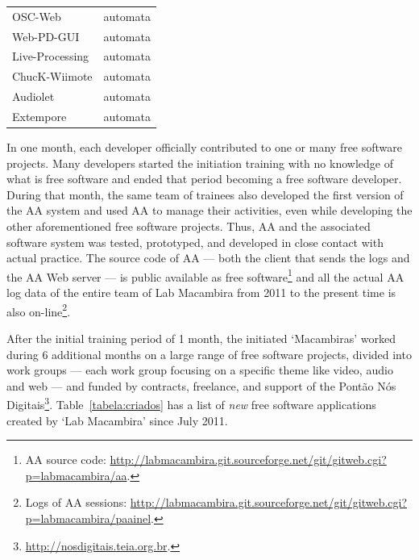 \documentclass{article}
\begin{document}
\begin{table}
\begin{center}
\begin{tabular}{|l|l|}
        OSC-Web               & automata                            \\
        Web-PD-GUI            & automata                            \\
        Live-Processing       & automata                            \\
        ChucK-Wiimote         & automata                            \\
        Audiolet              & automata                            \\
        Extempore             & automata                            \\
        \hline
    \end{tabular}
    \end{center}
    \label{tabela:contribuicoes}
\end{table}

In one month, each developer officially contributed to one or many free software
projects. Many developers started the initiation training with no knowledge of what
is free software and ended that period becoming a free software developer.
During that month, the same team of trainees also developed the first version of the AA
system and used AA to manage their activities, even while developing
the other aforementioned free software projects. Thus, AA and the associated
software system was tested, prototyped, and developed in close contact with
actual practice.  The source code of AA --- both the client that sends the
logs and the AA Web server --- is public available as free software\footnote{AA source
  code:
  \url{http://labmacambira.git.sourceforge.net/git/gitweb.cgi?p=labmacambira/aa}.}
and all the actual AA log data of the entire team of Lab Macambira from 2011 to
the present time is also on-line\footnote{Logs of AA sessions:
  \url{http://labmacambira.git.sourceforge.net/git/gitweb.cgi?p=labmacambira/paainel}.}.

After the initial training period of 1 month, the initiated `Macambiras'
worked during 6 additional months on a large range of free software projects,
divided into work groups --- each work group focusing on a specific theme like
video, audio and web --- and funded by contracts, freelance, and support of the
Pont\~{a}o N\'{o}s Digitais\footnote{\url{http://nosdigitais.teia.org.br}.}.
Table~\ref{tabela:criados} has a list of \emph{new} free software applications
created by `Lab Macambira' since July 2011.
\end{document}
